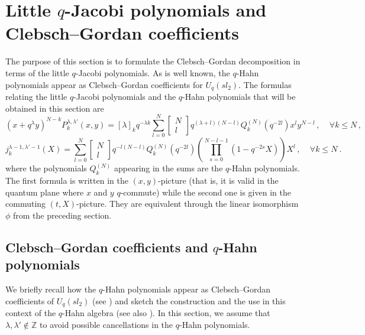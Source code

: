 \documentclass[a4paper,12pt]{article}
\numberwithin{equation}{section}
\newcommand{\qbinom}[2]{\begin{bmatrix}#1\\#2\end{bmatrix}}
\theoremstyle{rem}
\theoremstyle{definition}
\begin{document}
\section{Little $q$-Jacobi polynomials and Clebsch--Gordan coefficients}\label{sec4}

The purpose of this section is to formulate the Clebsch--Gordan decomposition in terms of the little $q$-Jacobi polynomials. As is well known, the $q$-Hahn polynomials appear as Clebsch--Gordan coefficients for $U_q(sl_2)$. The formulas relating the little $q$-Jacobi polynomials and the $q$-Hahn polynomials that will be obtained in this section are
\begin{equation}\label{convolution1}
    (x+q^{\lambda}y)^{N-k}P^{\lambda,\lambda'}_k(x,y)=[\lambda]_kq^{-\lambda k}\sum_{l=0}^N\qbinom{N}{l}q^{(\lambda+l)(N-l)}Q_{k}^{(N)}(q^{-2l})x^ly^{N-l}\,,\ \ \ \ \ \forall k\leq N\,,
\end{equation}
\begin{equation}\label{convolution2}
    j^{\lambda-1,\lambda'-1}_k(X)=\sum_{l=0}^N\qbinom{N}{l}q^{-l(N-l)}Q_{k}^{(N)}(q^{-2l})\left(\prod_{s=0}^{N-l-1}(1-q^{-2s}X)\right)X^l\,,\ \ \ \ \ \forall k\leq N\ .
\end{equation}
where the polynomials $Q_k^{(N)}$ appearing in the sums are the $q$-Hahn polynomials. The first formula is written in the $(x,y)$-picture (that is, it is valid in the quantum plane where $x$ and $y$ $q$-commute) while the second one is given in the commuting $(t,X)$-picture. They are equivalent through the linear isomorphism $\phi$ from the preceding section.

\subsection{Clebsch--Gordan coefficients and $q$-Hahn polynomials}

We briefly recall how the $q$-Hahn polynomials appear as Clebsch--Gordan coefficients of $U_q(sl_2)$ (see \cite{GranovskiZhedanov92,KVJ98,Ros}) and sketch the construction and the use in this context of the $q$-Hahn algebra \cite{Huang18} (see also \cite{Zhe91}). In this section, we assume that $\lambda,\lambda'\notin\mathbb{Z}$ to avoid possible cancellations in the $q$-Hahn polynomials.
\end{document}
